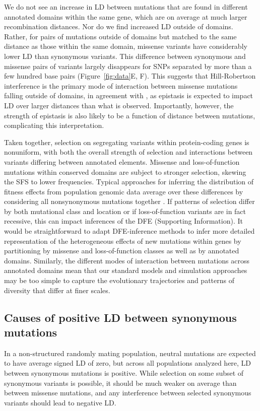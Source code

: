 \documentclass[]{article}
\begin{document}
We do not see an increase in LD between mutations that are found in different
annotated domains within the same gene, which are on average at much larger
recombination distances. Nor do we find increased LD outside of domains.
Rather, for pairs of mutations outside of domains but matched to the same
distance as those within the same domain, missense variants have considerably
lower LD than synonymous variants. This difference between synonymous and
missense pairs of variants largely disappears for SNPs separated by more than a
few hundred base pairs (Figure~\ref{fig:data}E, F). This suggests that
Hill-Robertson interference is the primary mode of interaction between missense
mutations falling outside of domains, in agreement with \citet{Garcia2021-zn},
as epistasis is expected to impact LD over larger distances than what is
observed. Importantly, however, the strength of epistasis is also likely to be
a function of distance between mutations, complicating this interpretation.

Taken together, selection on segregating variants within protein-coding genes
is nonuniform, with both the overall strength of selection and interactions
between variants differing between annotated elements. Missense and
loss-of-function mutations within conserved domains are subject to stronger
selection, skewing the SFS to lower frequencies. Typical approaches for
inferring the distribution of fitness effects from population genomic data
average over these differences by considering all nonsynonymous mutations
together \citep{Boyko2008-zk,Kim2017-xo}. If patterns of selection differ by
both mutational class and location or if loss-of-function variants are in fact
recessive, this can impact inferences of the DFE (Supporting Information). It
would be straightforward to adapt DFE-inference methods to infer more detailed
representation of the heterogeneous effects of new mutations within genes by
partitioning by missense and loss-of-function classes as well as by annotated
domains. Similarly, the different modes of interaction between mutations across
annotated domains mean that our standard models and simulation approaches may
be too simple to capture the evolutionary trajectories and patterns of
diversity that differ at finer scales.

\subsection{Causes of positive LD between synonymous mutations}

In a non-structured randomly mating population, neutral mutations are expected to have
average signed LD of zero, but across all populations analyzed here, LD between
synonymous mutations is positive. While selection on some subset of synonymous
variants is possible, it should be much weaker on average than between missense
mutations, and any interference between selected synonymous variants should
lead to negative LD.
\end{document}
